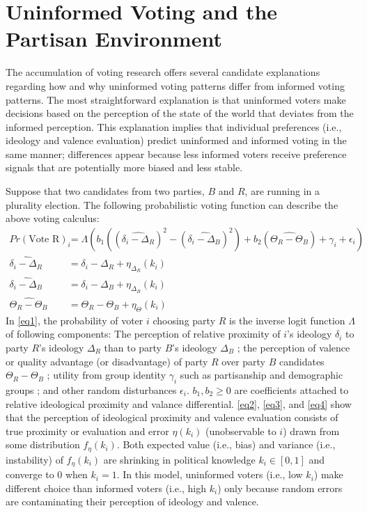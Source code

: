 \documentclass[letterpaper, 12pt]{article}
\begin{document}
    \section*{Uninformed Voting and the Partisan Environment}

    \par The accumulation of voting research offers several candidate explanations regarding how and why uninformed voting patterns differ from informed voting patterns. The most straightforward explanation is that uninformed voters make decisions based on the perception of the state of the world that deviates from the informed perception. This explanation implies that individual preferences (i.e., ideology and valence evaluation) predict uninformed and informed voting in the same manner; differences appear because less informed voters receive preference signals that are potentially more biased and less stable.

    \par Suppose that two candidates from two parties, $B$ and $R$, are running in a plurality election. The following probabilistic voting function can describe the above voting calculus:
    \begin{align}
        Pr(\text{Vote R})_i  &=  \Lambda\left( b_1\left( \left(\widehat{\delta_i-\Delta_{R}}\right)^2 - \left(\widehat{\delta_i-\Delta_{B}}\right)^2 \right) + b_2\left(\widehat{\Theta_{R} - \Theta_{B}}\right) + \gamma_i + \epsilon_i \right) \label{eq1} \\
        \widehat{\delta_i-\Delta_{R}} &= \delta_i-\Delta_{R} + \eta_{\Delta_R}(k_i) \label{eq2} \\
        \widehat{\delta_i-\Delta_{B}} &= \delta_i-\Delta_{B} + \eta_{\Delta_B}(k_i) \label{eq3} \\
        \widehat{\Theta_{R} - \Theta_{B}} &= \Theta_{R} - \Theta_{B} + \eta_{\Theta}(k_i) \label{eq4}
    \end{align}
    \noindent In \autoref{eq1}, the probability of voter $i$ choosing party $R$ is the inverse logit function $\Lambda$ of following components: The perception of relative proximity of $i$'s ideology $\delta_i$ to party $R$'s ideology $\Delta_R$ than to party $B$'s ideology $\Delta_B$ \citep{Downs1957anec}; the perception of valence or quality advantage (or disadvantage) of party $R$ over party $B$ candidates $\Theta_{R} - \Theta_{B}$ \citep{Adams2011whca}; utility from group identity $\gamma_i$ such as partisanship and demographic groups \citep{Campbell1964tham,Tajfel1986thso}; and other random disturbances $\epsilon_i$. $b_1, b_2 \geq 0$ are coefficients attached to relative ideological proximity and valance differential. \autoref{eq2}, \autoref{eq3}, and \autoref{eq4} show that the perception of ideological proximity and valence evaluation consists of true proximity or evaluation and error $\eta(k_i)$ (unobservable to $i$) drawn from some distribution $f_\eta(k_i)$. Both expected value (i.e., bias) and variance (i.e., instability) of $f_\eta(k_i)$ are shrinking in political knowledge $k_i \in [0,1]$ and converge to $0$ when $k_i=1$. In this model, uninformed voters (i.e., low $k_i$) make different choice than informed voters (i.e., high $k_i$) only because random errors are contaminating their perception of ideology and valence.
\end{document}
